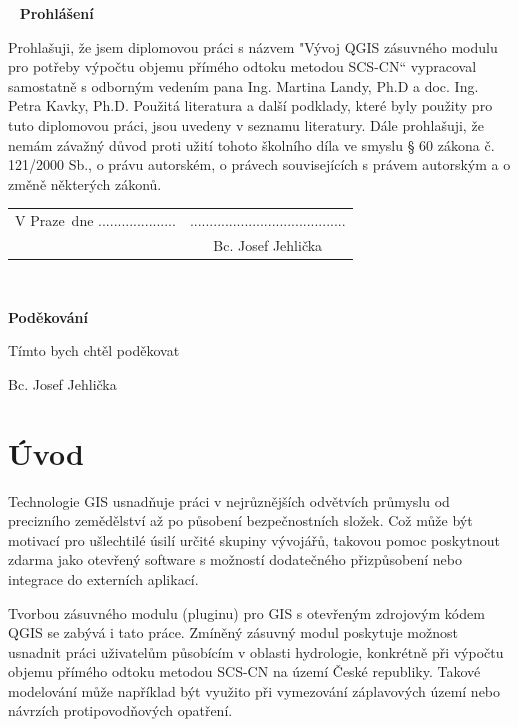 \documentclass[a4paper,oneside,12pt]{book}
\newcommand{\tb}{\textbf} %
\newcommand{\autor}{Bc. Josef Jehlička}   %
\newcommand{\kde}{Praze} %
\newcommand{\prohlaseni}{Prohlašuji, že jsem diplomovou práci s názvem "Vývoj QGIS zásuvného modulu pro potřeby výpočtu objemu přímého odtoku metodou SCS-CN“ vypracoval samostatně s odborným vedením pana Ing. Martina Landy, Ph.D a doc. Ing. Petra Kavky, Ph.D. Použitá literatura a další podklady, které byly použity pro tuto diplomovou práci, jsou uvedeny v seznamu literatury. Dále prohlašuji, že nemám závažný důvod proti užití tohoto školního díla ve smyslu § 60 zákona č. 121/2000 Sb., o právu autorském, o právech souvisejících s právem autorským a o změně některých zákonů.
} %
\newcommand{\podekovani}{Tímto bych chtěl poděkovat } %
\begin{document}
\newpage %
\thispagestyle{empty}  %

~ %
\vfill %
\vspace{1em}
\tb{Prohlášení} %

\vspace{1em} %
\prohlaseni

\vspace{2em}  %
\hspace{-0.5em}\begin{tabularx}{\textwidth}{X c}  %
V \kde\ dne .................... &........................................ \\	%
	& \autor
\end{tabularx}	%







\newpage %
\thispagestyle{empty}  %

~
\vfill %


\vspace{1em}
\tb{Poděkování}

\vspace{1em} %
\podekovani
\begin{flushright}
\autor
\end{flushright}  %





\newpage
\tableofcontents


\newpage
\chapter*{Úvod} \label{uvod}
Technologie GIS usnadňuje práci v nejrůznějších odvětvích průmyslu od precizního zemědělství až po působení bezpečnostních složek. Což může být motivací pro ušlechtilé úsilí určité skupiny vývojářů, takovou pomoc poskytnout zdarma jako otevřený software s možností dodatečného přizpůsobení nebo integrace do externích aplikací. 

Tvorbou zásuvného modulu (pluginu) pro GIS s otevřeným zdrojovým kódem QGIS se zabývá i tato práce. Zmíněný zásuvný modul poskytuje možnost usnadnit práci uživatelům působícím v oblasti hydrologie, konkrétně při výpočtu objemu přímého odtoku metodou SCS-CN na území České republiky. Takové modelování může například být využito při vymezování záplavových území nebo návrzích protipovodňových opatření.
\end{document}
